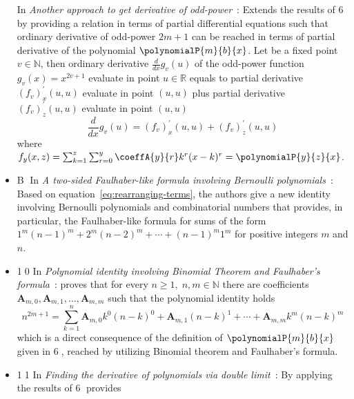 \begin{itemize}
    In \textit{Another approach to get derivative of odd-power}~\cite{another_approach_to_get_derivative_of_odd_power}:
    Extends the results of {\Large \textcircled{\normalsize 6}} by providing a relation in terms of partial differential equations such that
    ordinary derivative of odd-power $2m+1$ can be reached in terms of partial derivative of the polynomial $\polynomialP{m}{b}{x}$.
    Let be a fixed point $v\in \mathbb{N}$, then ordinary derivative $\frac{d}{dx} g_v (u)$ of the odd-power function $g_v(x) = x^{2v + 1}$
    evaluate in point $u\in\mathbb{R}$ equals to partial derivative $(f_{v})^{'}_{x} (u, u)$ evaluate in point $(u, u)$ plus
    partial derivative $(f_{v})^{'}_{z} (u, u)$ evaluate in point $(u, u)$
    \begin{equation}
        \frac{d}{dx} g_v (u) = (f_{v})^{'}_{x} (u, u) + (f_{v})^{'}_{z} (u, u)
        \label{eq:odd-exponential-identity}
    \end{equation}
    where $f_{y} (x, z) = \sum_{k=1}^{z} \sum_{r=0}^{y} \coeffA{y}{r} k^r (x-k)^r = \polynomialP{y}{z}{x}$.
    \item {\Large \textcircled{\normalsize B}}
    In \textit{A two-sided Faulhaber-like formula involving Bernoulli polynomials}~\cite{barbero2020two}:
    Based on equation~\eqref{eq:rearranging-terms}, the authors give a new identity involving
    Bernoulli polynomials and combinatorial numbers that provides,
    in particular, the Faulhaber-like formula for sums of the form $1^m(n-1)^m + 2^m (n -2)^m + \cdots + (n - 1)^m 1^m$
    for positive integers $m$ and $n$.
    \item {\Large \textcircled{\normalsize 10}}
    In \textit{Polynomial identity involving Binomial Theorem and Faulhaber's formula}~\cite{polynomial_identity_with_binomial_theorem_and_faulhabers_formula}:
    proves that
    for every $n\geq 1, \; n,m\in\mathbb{N}$
    there are coefficients $\mathbf{A}_{m,0}, \mathbf{A}_{m,1}, \ldots, \mathbf{A}_{m,m}$ such that
    the polynomial identity holds
    \[
        n^{2m+1} = \sum_{k=1}^{n} \mathbf{A}_{m,0} k^0 (n-k)^0 + \mathbf{A}_{m,1}(n-k)^1
        + \cdots + \mathbf{A}_{m,m} k^m (n-k)^m
    \]
    which is a direct consequence of the definition of $\polynomialP{m}{b}{x}$ given in {\Large \textcircled{\normalsize 6}},
    reached by utilizing Binomial theorem and Faulhaber's formula.
    \item {\Large \textcircled{\normalsize 11}}
    In \textit{Finding the derivative of polynomials via double limit}~\cite{derivative_of_polynomials_via_double_limit}:
    By applying the results of {\Large \textcircled{\normalsize 6}} provides

\end{itemize}
